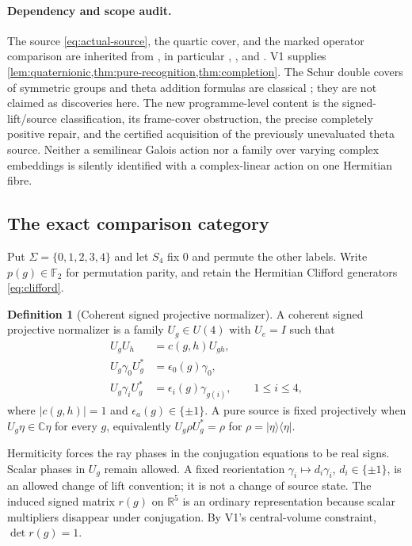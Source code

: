 \documentclass[11pt]{article}
\theoremstyle{definition}
\newtheorem{definition}[definition]{Definition}
\theoremstyle{remark}
\newcommand{\C}{\mathbb C}
\newcommand{\R}{\mathbb R}
\newcommand{\F}{\mathbb F}
\newcommand{\ketbra}[1]{|#1\rangle\langle#1|}
\begin{document}
\paragraph{Dependency and scope audit.}
The source \eqref{eq:actual-source}, the quartic cover, and the marked
operator comparison are inherited from \cite{AD9}, in particular
,
, and
. V1 supplies
\cref{lem:quaternionic,thm:pure-recognition,thm:completion}. The Schur double
covers of symmetric groups and theta addition formulas are classical
\cite{ReichsteinShukla,DLMFTheta}; they are not claimed as discoveries here.
The new programme-level content is the signed-lift/source classification,
its frame-cover obstruction, the precise completely positive repair, and
the certified acquisition of the previously unevaluated theta source.
Neither a semilinear Galois action nor a family over varying complex
embeddings is silently identified with a complex-linear action on one
Hermitian fibre.

\subsection{The exact comparison category}
Put $\Sigma=\{0,1,2,3,4\}$ and let $S_4$ fix $0$ and permute the other
labels. Write $p(g)\in\F_2$ for permutation parity, and retain the
Hermitian Clifford generators \eqref{eq:clifford}.

\begin{definition}[Coherent signed projective normalizer]
\label{def:v2-normalizer}
A coherent signed projective normalizer is a family $U_g\in U(4)$ with
$U_e=I$ such that
\begin{align}
 U_gU_h&=c(g,h)U_{gh},\\
 U_g\gamma_0U_g^*&=\epsilon_0(g)\gamma_0,\\
 U_g\gamma_iU_g^*&=\epsilon_i(g)\gamma_{g(i)},\qquad 1\le i\le4,
 \label{eq:v2-normalizer}
\end{align}
where $|c(g,h)|=1$ and $\epsilon_a(g)\in\{\pm1\}$. A pure source is
fixed projectively when $U_g\eta\in\C\eta$ for every $g$, equivalently
$U_g\rho U_g^*=\rho$ for $\rho=\ketbra\eta$.
\end{definition}

Hermiticity forces the ray phases in the conjugation equations to be real
signs. Scalar phases in $U_g$ remain allowed. A fixed reorientation
$\gamma_i\mapsto d_i\gamma_i$, $d_i\in\{\pm1\}$, is an allowed change
of lift convention; it is not a change of source state. The induced signed
matrix $r(g)$ on $\R^5$ is an ordinary representation because scalar
multipliers disappear under conjugation. By V1's central-volume constraint,
$\det r(g)=1$.
\end{document}
